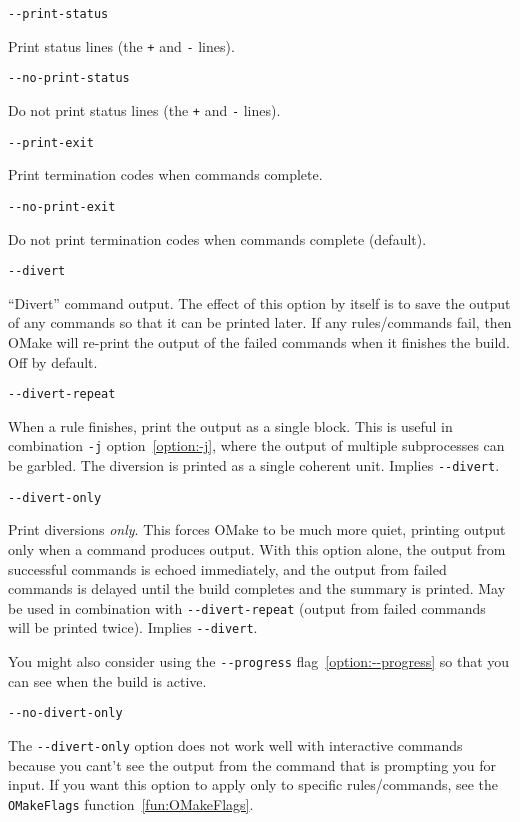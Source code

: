  \verb+--print-status+

Print status lines (the \verb/+/ and \verb/-/ lines).

 \verb+--no-print-status+

Do not print status lines (the \verb/+/ and \verb/-/ lines).

 \verb+--print-exit+

Print termination codes when commands complete.

 \verb+--no-print-exit+

Do not print termination codes when commands complete (default).

 \verb+--divert+

``Divert'' command output.  The effect of this option by itself is to save the
output of any commands so that it can be printed later.  If any rules/commands fail, then OMake will
re-print the output of the failed commands when it finishes the build.  Off by default.

 \verb+--divert-repeat+

When a rule finishes, print the output as a single block.  This is useful
in combination \verb+-j+ option~\ref{option:-j}, where the output of multiple subprocesses can be
garbled.  The diversion is printed as a single coherent unit.  Implies \verb+--divert+.

 \verb+--divert-only+ 

Print diversions \emph{only}.  This forces OMake to be much more quiet,
printing output only when a command produces output.  With this option alone, the output from
successful commands is echoed immediately, and the output from failed commands is delayed until the
build completes and the summary is printed.  May be used in combination with \verb+--divert-repeat+
(output from failed commands will be printed twice).  Implies \verb+--divert+.

You might also consider using the \verb+--progress+ flag~\ref{option:--progress} so that you can see
when the build is active.

 \verb+--no-divert-only+

The \verb+--divert-only+ option does not work well with interactive
commands because you cant't see the output from the command that is prompting you for input.  If
you want this option to apply only to specific rules/commands, see the \verb+OMakeFlags+
function~\ref{fun:OMakeFlags}.


